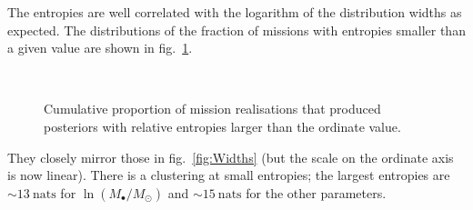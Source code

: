 \documentclass[useAMS,usedcolumn,usegraphicx,usenatbib]{mn2e}
\newcommand{\figref}[1]{fig.~\ref{fig:#1}}
\newcommand{\units}[1]{\ensuremath{~\mathrm{#1}}}
\begin{document}
The entropies are well correlated with the logarithm of the distribution widths as expected. The distributions of the fraction of missions with entropies smaller than a given value are shown in \figref{H-ent}.
\begin{figure}
\begin{center}
    \quad 
    \\
    \quad
\caption{Cumulative proportion of mission realisations that produced posteriors with relative entropies larger than the ordinate value.\label{fig:H-ent}}
  \end{center}
\end{figure}
They closely mirror those in \figref{Widths} (but the scale on the ordinate axis is now linear). There is a clustering at small entropies; the largest entropies are $\sim 13\units{nats}$ for $\ln(M_\bullet/M_\odot)$ and $\sim 15\units{nats}$ for the other parameters.
\end{document}
